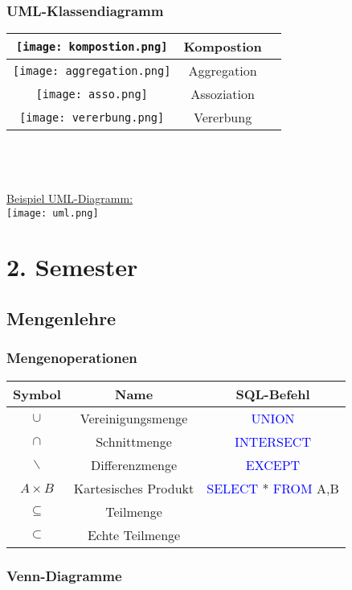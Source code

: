 \documentclass[10pt,a4paper]{article}
\begin{document}
\subsubsection{UML-Klassendiagramm}
\begin{tabular}{c|c|c}
\texttt{[image: kompostion.png]}   & Kompostion & \\
\hline
\texttt{[image: aggregation.png]}  &Aggregation &\\
\hline
\texttt{[image: asso.png]}  &Assoziation &  \\
\hline
\texttt{[image: vererbung.png]}  & Vererbung &\\
\end{tabular}
\\ \\ \\
\underline{Beispiel UML-Diagramm:} \\
\texttt{[image: uml.png]} 

\newpage

\section{2. Semester}

\subsection{Mengenlehre}
\subsubsection{Mengenoperationen}
\begin{tabular}{c|c|c}
Symbol & Name & SQL-Befehl \\
\hline
$\cup$ & Vereinigungsmenge & \textcolor{blue}{UNION} \\
\hline
$\cap$ & Schnittmenge & \textcolor{blue}{INTERSECT} \\
\hline
$\backslash$ & Differenzmenge & \textcolor{blue}{EXCEPT} \\
\hline
$A \times B$ & Kartesisches Produkt & \textcolor{blue}{SELECT} * \textcolor{blue}{FROM} A,B\\
\hline
$\subseteq$ & Teilmenge &  \\
\hline
$\subset$ & Echte Teilmenge &  \\
\end{tabular}
\subsubsection{Venn-Diagramme}
\end{document}
